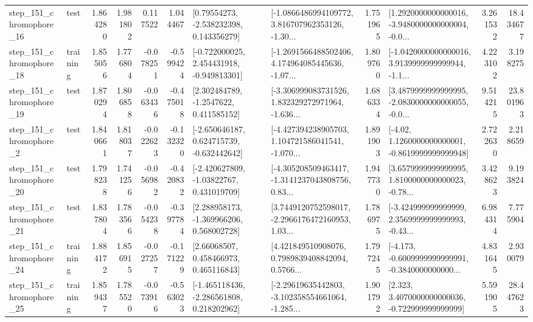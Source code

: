 \begin{tabular}{llrrrrllrlrr}
  step\_151\_chromophore\_16 &      test &      1.864280 &    1.981802 &      0.117522 &  1.044467 &     [0.79554273, -2.538232398, 0.143356279] &  [-1.0866486994109772, 3.816707962353126, -1.30... &       1.751965 &  [1.2920000000000016, -3.9480000000000004, -0.0... &            3.261532 &         18.434677 \\
  step\_151\_chromophore\_18 &  training &      1.855056 &    1.776804 &     -0.078251 & -0.599424 &   [-0.722000025, 2.454431918, -0.949813301] &  [-1.2691566488502406, 4.174964085445636, -1.07... &       1.809760 &  [-1.0420000000000016, 3.9139999999999944, -1.1... &            4.223102 &          3.198275 \\
  step\_151\_chromophore\_19 &      test &      1.870294 &    1.806858 &     -0.063436 & -0.475018 &      [2.302484789, -1.2547622, 0.411585152] &  [-3.306999083731526, 1.832329272971964, -1.636... &       1.686334 &  [3.4879999999999995, -2.0830000000000055, -0.0... &            9.514215 &         23.801963 \\
   step\_151\_chromophore\_2 &      test &      1.840661 &    1.818037 &     -0.022623 & -0.132320 &   [-2.650646187, 0.624715739, -0.632442642] &  [-4.427394238905703, 1.104721586041541, -1.070... &       1.891903 &   [-4.02, 1.1260000000000001, -0.8619999999999948] &            2.722630 &          2.218659 \\
  step\_151\_chromophore\_20 &      test &      1.798238 &    1.741256 &     -0.056982 & -0.420832 &    [-2.420627809, -1.03822767, 0.431019709] &  [-4.305208509463417, -1.3141237043808756, 0.83... &       1.947730 &  [3.6579999999999995, 1.8100000000000023, -0.78... &            3.428623 &          9.193824 \\
  step\_151\_chromophore\_21 &      test &      1.837804 &    1.783566 &     -0.054238 & -0.397784 &    [2.288958173, -1.369966206, 0.568002728] &  [3.7449120752598017, -2.2966176472160953, 1.03... &       1.786975 &  [-3.424999999999999, 2.3569999999999993, -0.43... &            6.984314 &          7.775904 \\
  step\_151\_chromophore\_24 &  training &      1.884172 &    1.856915 &     -0.027257 & -0.171229 &      [2.66068507, 0.458466973, 0.465116843] &  [4.421849510908076, 0.7989839408842094, 0.5766... &       1.797245 &  [-4.173, -0.6009999999999991, -0.3840000000000... &            4.831645 &          2.930079 \\
  step\_151\_chromophore\_25 &  training &      1.859437 &    1.785520 &     -0.073916 & -0.563023 &   [-1.465118436, -2.286561808, 0.218202962] &  [-2.29619635442803, -3.102358554661064, -1.285... &       1.901792 &    [2.323, 3.4070000000000036, -0.722999999999999] &            5.591905 &         28.447623 \\

\end{tabular}
